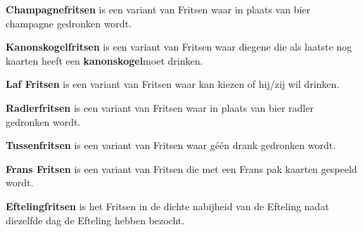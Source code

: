 
\newpage
\drawBar{}

\item \textbf{Champagnefritsen} is een variant van Fritsen waar in plaats van bier champagne gedronken wordt.

\item \textbf{Kanonskogelfritsen} is een variant van Fritsen waar diegene die als laatste nog kaarten heeft een \textbf{kanonskogel}\footnotemark[1] moet drinken. 

\item \textbf{Laf Fritsen} is een variant van Fritsen waar \eenSpeler kan kiezen of hij/zij wil drinken.

\item \textbf{Radlerfritsen} is een variant van Fritsen waar in plaats van bier radler gedronken wordt.

\item \textbf{Tussenfritsen} is een variant van Fritsen waar g\'e\'en drank gedronken wordt.

\item \textbf{Frans Fritsen} is een variant van Fritsen die met een Frans pak kaarten gespeeld wordt.

\item \textbf{Eftelingfritsen} is het Fritsen in de dichte nabijheid van de Efteling nadat \alleSpelers diezelfde dag de Efteling hebben bezocht.
\eindABCLijst


